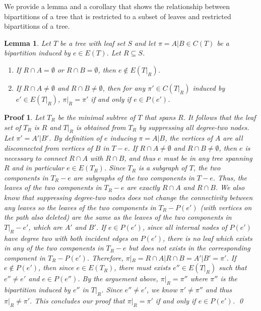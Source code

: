 \documentclass[twocolumn]{bmcart}%
\theoremstyle{mystyle}
\newtheorem{lemma}{Lemma}
\theoremstyle{proofstyle}
\newtheorem*{proof2}{Proof}
\newenvironment{proofnospace}{\begin{proof2}}{\qed \end{proof2}}
\begin{document}
We provide a lemma and a corollary that shows the relationship between bipartitions of a tree that is restricted to a subset of leaves and restricted bipartitions of a tree. 
\begin{lemma} \label{lem:bipar_restrict_edge}
    Let $T$ be a tree with leaf set $S$ and let $\pi = A|B \in C(T)$ be a bipartition induced by $e \in E(T)$. Let $R \subseteq S$.
    \begin{enumerate}
        \item If $R \cap A = \emptyset$ or $R \cap B = \emptyset$, then $e \notin E(T|_R)$.
        \item If $R \cap A \neq \emptyset$ and $R \cap B \neq \emptyset$, then for any $\pi' \in C(T|_R)$ induced by $e' \in E(T|_R)$, $\pi|_R = \pi'$ if and only if $e \in P(e')$.
    \end{enumerate}
\end{lemma}
\begin{proofnospace}
Let $T_R$ be the minimal subtree of $T$ that spans $R$. It follows that the leaf set of $T_R$ is $R$ and $T|_R$ is obtained from $T_R$ by suppressing all degree-two nodes. Let $\pi' = A'|B'$. By definition of $e$ inducing $\pi = A|B$, the vertices of $A$ are all disconnected from vertices of $B$ in $T-e$. If $R\cap A \neq \emptyset$ and $R\cap B \neq \emptyset$, then $e$ is necessary to connect $R\cap A$ with $R \cap B$, and thus $e$ must be in any tree spanning $R$ and in particular $e \in E(T_R)$. Since $T_R$ is a subgraph of $T$, the two components in $T_R-e$ are subgraphs of the two components in $T-e$. Thus, the leaves of the two components in $T_R-e$ are exactly $R\cap A$ and $R\cap B$. We also know that suppressing degree-two nodes does not change the connectivity between any leaves so the leaves of the two components in $T_R - P(e')$ (with vertices on the path also deleted) are the same as the leaves of the two components in $T|_R - e'$, which are $A'$ and $B'$. If $e \in P(e')$, since all internal nodes of $P(e')$ have degree two with both incident edges on $P(e')$, there is no leaf which exists in any of the two components in $T_R - e$ but does not exists in the corresponding component in $T_R-P(e')$. Therefore, $\pi|_R = R\cap A|R\cap B = A'|B' = \pi'$. If $e \notin P(e')$, then since $e \in E(T_R)$, there must exists $e'' \in E(T|_R)$ such that $e'' \neq e'$ and $e \in P(e'')$. By the arguement above, $\pi|_R = \pi''$ where $\pi''$ is the bipartition induced by $e''$ in $T|_R$. Since $e'' \neq e'$, we know $\pi' \neq \pi''$ and thus $\pi|_R \neq \pi'$. This concludes our proof that $\pi|_R = \pi'$ if and only if $e \in P(e')$. 
\end{proofnospace}
\end{document}
